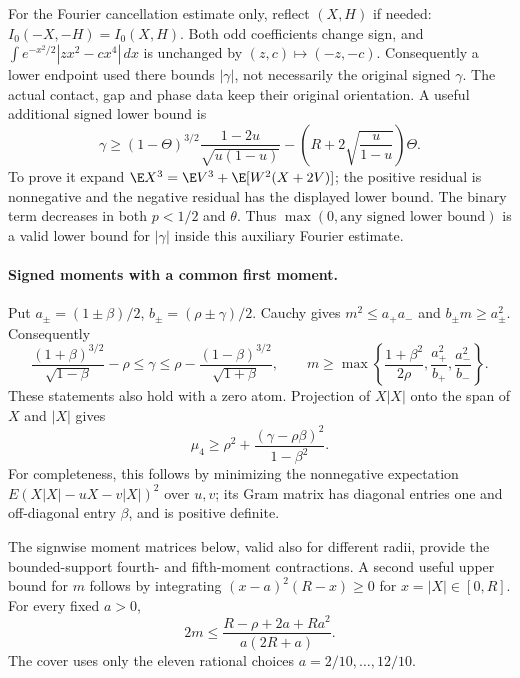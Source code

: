 For the Fourier cancellation estimate only, reflect $(X,H)$ if needed:
$I_0(-X,-H)=I_0(X,H)$. Both odd coefficients change sign, and
$\int e^{-x^2/2}|zx^2-cx^4|\,dx$ is unchanged by $(z,c)\mapsto(-z,-c)$.
Consequently a lower endpoint used there bounds $|\gamma|$, not necessarily
the original signed $\gamma$. The actual contact, gap and phase data keep
their original orientation. A useful additional signed lower bound is
\begin{equation}\label{j:local:re:gamma}
 \gamma\ge(1-\Theta)^{3/2}\frac{1-2u}{\sqrt{u(1-u)}}
       -\left(R+2\sqrt{\frac{u}{1-u}}\right)\Theta.
\end{equation}
To prove it expand $\E X^3=\E V^3+\E[W^2(X+2V)]$; the positive
residual is nonnegative and the negative residual has the displayed
lower bound. The binary term decreases in both $p<1/2$ and $\theta$.
Thus $\max(0,\text{any signed lower bound})$ is a valid lower bound for
$|\gamma|$ inside this auxiliary Fourier estimate.



\paragraph{Signed moments with a common first moment.}\label{j:local:atlas}\label{j:local:moments}
Put $a_\pm=(1\pm\beta)/2$, $b_\pm=(\rho\pm\gamma)/2$.
Cauchy gives $m^2\le a_+a_-$ and $b_\pm m\ge a_\pm^2$.
Consequently
\[
 \frac{(1+\beta)^{3/2}}{\sqrt{1-\beta}}-\rho
 \le\gamma\le
 \rho-\frac{(1-\beta)^{3/2}}{\sqrt{1+\beta}},\qquad
 m\ge\max\left\{\frac{1+\beta^2}{2\rho},
                  \frac{a_+^2}{b_+},\frac{a_-^2}{b_-}\right\}.
\]
These statements also hold with a zero atom. Projection of $X|X|$ onto
the span of $X$ and $|X|$ gives
\[
 \mu_4\ge\rho^2+\frac{(\gamma-\rho\beta)^2}{1-\beta^2}.
\]
For completeness, this follows by minimizing the nonnegative expectation
$E(X|X|-uX-v|X|)^2$ over $u,v$; its Gram matrix has diagonal entries
one and off-diagonal entry $\beta$, and is positive definite.

The signwise moment matrices below, valid also for different radii,
provide the bounded-support fourth- and fifth-moment contractions.
A second useful upper bound for $m$ follows by integrating
$(x-a)^2(R-x)\ge0$ for $x=|X|\in[0,R]$. For every fixed $a>0$,
\[
 2m\le\frac{R-\rho+2a+Ra^2}{a(2R+a)}.
\]
The cover uses only the eleven rational choices $a=2/10,\ldots,12/10$.

